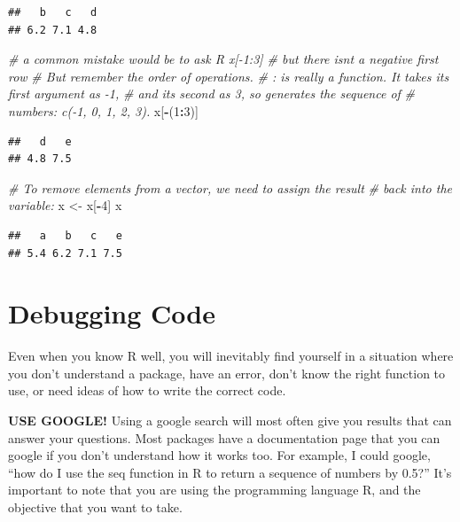 \documentclass[
]{book}
\newenvironment{Shaded}{\begin{snugshade}}{\end{snugshade}}
\newcommand{\CommentTok}[1]{\textcolor[rgb]{0.56,0.35,0.01}{\textit{#1}}}
\newcommand{\DecValTok}[1]{\textcolor[rgb]{0.00,0.00,0.81}{#1}}
\newcommand{\NormalTok}[1]{#1}
\newcommand{\OtherTok}[1]{\textcolor[rgb]{0.56,0.35,0.01}{#1}}
\newcommand{\SpecialCharTok}[1]{\textcolor[rgb]{0.81,0.36,0.00}{\textbf{#1}}}
\begin{document}
\begin{verbatim}
##   b   c   d 
## 6.2 7.1 4.8
\end{verbatim}

\begin{Shaded}
\begin{Highlighting}[]
\CommentTok{\# a common mistake would be to ask R x[{-}1:3] \# but there isn\textquotesingle{}t a negative first row}
\CommentTok{\# But remember the order of operations. }
\CommentTok{\# : is really a function. It takes its first argument as {-}1, }
\CommentTok{\# and its second as 3, so generates the sequence of }
\CommentTok{\# numbers: c({-}1, 0, 1, 2, 3).}
\NormalTok{x[}\SpecialCharTok{{-}}\NormalTok{(}\DecValTok{1}\SpecialCharTok{:}\DecValTok{3}\NormalTok{)]}
\end{Highlighting}
\end{Shaded}

\begin{verbatim}
##   d   e 
## 4.8 7.5
\end{verbatim}

\begin{Shaded}
\begin{Highlighting}[]
\CommentTok{\# To remove elements from a vector, we need to assign the result }
\CommentTok{\# back into the variable:}
\NormalTok{x }\OtherTok{\textless{}{-}}\NormalTok{ x[}\SpecialCharTok{{-}}\DecValTok{4}\NormalTok{]}
\NormalTok{x}
\end{Highlighting}
\end{Shaded}

\begin{verbatim}
##   a   b   c   e 
## 5.4 6.2 7.1 7.5
\end{verbatim}

\chapter{Debugging Code}\label{debugging-code}

Even when you know R well, you will inevitably find yourself in a situation where you don't understand a package, have an error, don't know the right function to use, or need ideas of how to write the correct code.

\textbf{USE GOOGLE!}
Using a google search will most often give you results that can answer your questions. Most packages have a documentation page that you can google if you don't understand how it works too. For example, I could google, ``how do I use the seq function in R to return a sequence of numbers by 0.5?'' It's important to note that you are using the programming language R, and the objective that you want to take.
\end{document}
